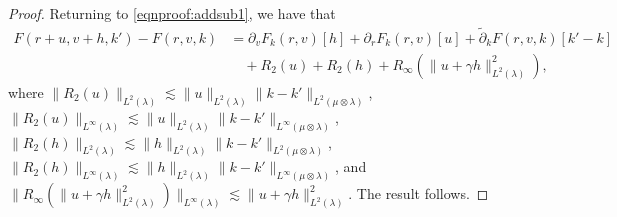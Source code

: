 \documentclass[11pt]{article}
\newcommand{\adk}{\widetilde{\partial}_k}
\theoremstyle{plain}
\begin{document}
\begin{proof}
 Returning to \eqref{eqnproof:addsub1}, we have that 
\begin{align*}
    F(r + u, v+ h, k') - F(r , v, k)    &= \partial_v F_{k}(r,v)[h] + \partial_r F_{k}(r,v)[u]   + \adk F(r,v, k)[k' - k] \\
     & \quad + R_2(u) + R_2(h) + R_{\infty}(\|u + \gamma h\|_{L^2(\lambda)}^2),
\end{align*}
where $\|R_2(u)\|_{L^2(\lambda)} \lesssim \|u\|_{L^2(\lambda)}\|k - k'\|_{L^2(\mu \otimes \lambda)} $, $\|R_2(u)\|_{L^\infty(\lambda)} \lesssim \|u\|_{L^2(\lambda)}\|k - k'\|_{L^\infty(\mu \otimes \lambda)} $, $\|R_2(h)\|_{L^2(\lambda)} \lesssim \|h\|_{L^2(\lambda)}\|k - k'\|_{L^2(\mu \otimes \lambda)} $, $\|R_2(h)\|_{L^\infty(\lambda)} \lesssim \|h\|_{L^2(\lambda)}\|k - k'\|_{L^\infty(\mu \otimes \lambda)} $, and $\|R_{\infty}(\|u + \gamma h\|_{L^2(\lambda)}^2)\|_{L^\infty(\lambda)} \lesssim \|u + \gamma h\|_{L^2(\lambda)}^2$. The result follows.

\end{proof}
\end{document}
